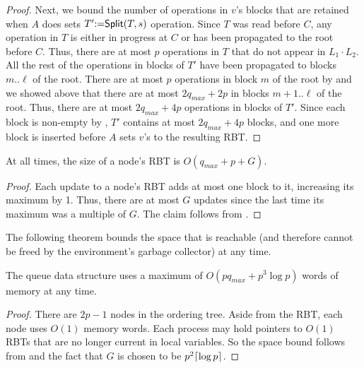 \begin{proof}
Next, we bound the number of operations in $v$'s blocks that are retained when $A$ does sets
$T'\mbox{:=}{\sf Split}(T,s)$ operation.
Since $T$ was read before $C$, any operation in $T$ is either in progress at $C$ or has been propagated to the root before $C$.
Thus, there are at most $p$ operations in $T$ that do not appear in $L_1\cdot L_2$.
All the rest of the operations in blocks of $T'$ have been propagated to blocks $m..\ell$ of the root.
There are at most $p$ operations in block $m$ of the root by 
and we showed above that there are at most $2q_{max} + 2p$ in blocks 
$m+1..\ell$ of the root.
Thus, there are at most $2q_{max}+4p$ operations in blocks of $T'$.
Since each block is non-empty by , $T'$ contains at most $2q_{max}+4p$ blocks, and one more 
block is inserted before $A$ sets $v$'s  to the resulting RBT.
\end{proof}


\begin{corollary}\label{RBTbound}
At all times, the size of a node's RBT is $O(q_{max}+p+G)$. 
\end{corollary}
\begin{proof}
Each update to a node's RBT adds at most one block to it, increasing its maximum  by 1.
Thus, there are at most $G$ updates since the last time its maximum  was a multiple of $G$.
The claim follows from .
\end{proof}

The following theorem bounds the space that is reachable (and therefore cannot be freed by the environment's garbage collector) at any time.

\begin{theorem}\label{spaceBound}
The queue data structure uses a maximum of $O(pq_{max}+p^3\log p)$ words of memory at any time.
\end{theorem}
\begin{proof}
There are $2p-1$ nodes in the ordering tree.  Aside from the RBT, each node uses $O(1)$ memory words.
Each process may hold pointers to $O(1)$ RBTs that are no longer current in local variables.
So the space bound follows from  and the fact that $G$ is chosen
to be $p^2\lceil \log p \rceil$.
\end{proof}

